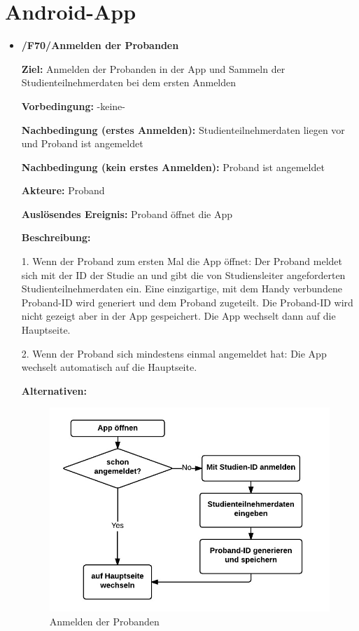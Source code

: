\documentclass[a4paper]{scrreprt}
\begin{document}
    \newpage
    \section{\gls{Android-App}}

        \begin{itemize}
            \item \textbf{/F70/Anmelden der \gls{Proband}en}

                \par \textbf{Ziel: }Anmelden der \gls{Proband}en in der App und Sammeln der Studienteilnehmerdaten bei dem ersten Anmelden
                \par \textbf{Vorbedingung: }-keine-
                \par \textbf{Nachbedingung (erstes Anmelden): }Studienteilnehmerdaten liegen vor und \gls{Proband} ist angemeldet
                \par \textbf{Nachbedingung (kein erstes Anmelden): }\gls{Proband} ist angemeldet
                \par \textbf{Akteure: }\gls{Proband}
                \par \textbf{Auslösendes Ereignis: }\gls{Proband} öffnet die App
                \par \textbf{Beschreibung: }
                \par 1. Wenn der \gls{Proband} zum ersten Mal die App öffnet: Der \gls{Proband} meldet sich mit der ID der Studie an und gibt die von \gls{Studiensleiter} angeforderten Studienteilnehmerdaten ein. Eine einzigartige, mit dem Handy verbundene \gls{Proband}-ID wird generiert und dem \gls{Proband} zugeteilt. Die \gls{Proband}-ID wird nicht gezeigt aber in der App gespeichert. Die App wechselt dann auf die Hauptseite.
                \par 2. Wenn der \gls{Proband} sich mindestens einmal angemeldet hat: Die App wechselt automatisch auf die Hauptseite.
                \par \textbf{Alternativen: }
                \begin{figure}[ht]
                    \centering
                    \includegraphics[scale=1]{AppAnmelden.jpeg}
                    \caption{Anmelden der \gls{Proband}en}
                \end{figure}



\end{itemize}
\end{document}
